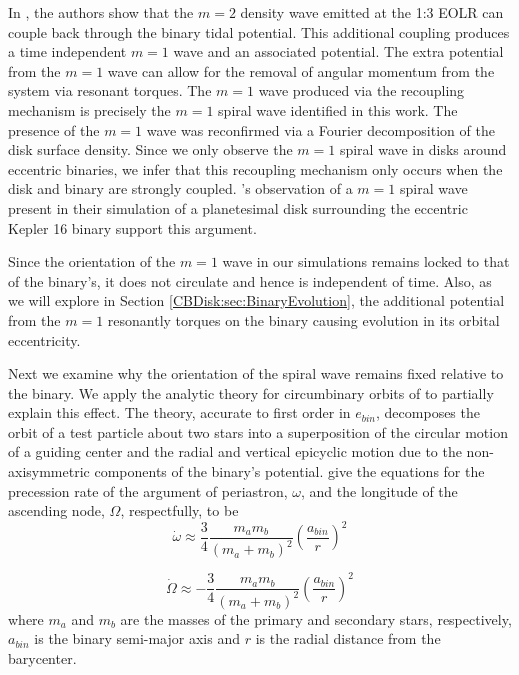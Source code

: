 In \citet{Papaloizou2001}, the authors show that the $m=2$ density wave
emitted at the 1:3 EOLR can couple back through the binary tidal potential. This additional coupling produces a time independent $m = 1$ wave and an associated potential.  The extra potential from the $m = 1$ wave can allow for the removal of angular momentum from the system via resonant torques.  The $m = 1$ wave produced via the recoupling mechanism is precisely the $m = 1$ spiral wave identified in this work.  The presence of the $m = 1$ wave was reconfirmed via a Fourier decomposition of the disk surface density.  Since we only observe the $m = 1$ spiral wave in disks around eccentric binaries, we infer that this recoupling mechanism only occurs when the disk and binary are strongly coupled.  \citet{Lines2016}'s observation of a $m = 1$ spiral wave present in their simulation of a planetesimal disk surrounding the eccentric Kepler 16 binary support this argument.

Since the orientation of the $m = 1$ wave in our simulations remains locked to that of the binary's, it does not circulate and hence is independent of time.  Also, as we will explore in Section \ref{CBDisk:sec:BinaryEvolution}, the additional potential from the $m = 1$ resonantly torques on the binary causing evolution in its orbital eccentricity.  

Next we examine why the orientation of the spiral wave remains fixed relative to the binary.  We apply the analytic theory for circumbinary orbits of \citet{Leung2013} to partially explain this effect.  The theory, accurate to first order in $e_{bin}$, decomposes the orbit of a test particle about two stars into a superposition of the circular motion of a guiding center and the radial and vertical epicyclic motion due to the non-axisymmetric components of the binary's potential.  \citet{Leung2013} give the equations for the precession rate of the argument of periastron, $\omega$, and the longitude of the ascending node, $\Omega$, respectfully, to be
\begin{equation}
\label{CBDisk:eqn:Periastron}
\dot{\omega} \approx \frac{3}{4} \frac{m_a m_b}{(m_a + m_b)^2} \left( \frac{a_{bin}}{r} \right)^2
\end{equation}

\begin{equation}
\label{CBDisk:eqn:Longitude}
\dot{\Omega} \approx -\frac{3}{4} \frac{m_a m_b}{(m_a + m_b)^2} \left( \frac{a_{bin}}{r} \right)^2
\end{equation}
where $m_a$ and $m_b$ are the masses of the primary and secondary stars, respectively, $a_{bin}$ is the binary semi-major
axis and $r$ is the radial distance from the barycenter. 

